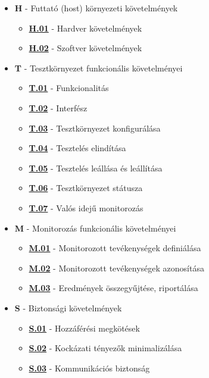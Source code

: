 \documentclass{scrreprt}
\begin{document}
\begin{itemize}
      \item \textbf{H} - Futtató (host) környezeti követelmények
            \begin{itemize}
                  \item \textbf{\hyperref[H.01]{H.01}} - Hardver követelmények
                  \item \textbf{\hyperref[H.02]{H.02}} - Szoftver követelmények
            \end{itemize}
      \item \textbf{T} - Tesztkörnyezet funkcionális követelményei
            \begin{itemize}
                  \item \textbf{\hyperref[T.01]{T.01}} - Funkcionalitás
                  \item \textbf{\hyperref[T.02]{T.02}} - Interfész
                  \item \textbf{\hyperref[T.03]{T.03}} - Tesztkörnyezet konfigurálása
                  \item \textbf{\hyperref[T.04]{T.04}} - Tesztelés elindítása
                  \item \textbf{\hyperref[T.05]{T.05}} - Tesztelés leállása és leállítása
                  \item \textbf{\hyperref[T.06]{T.06}} - Tesztkörnyezet státusza
                  \item \textbf{\hyperref[T.07]{T.07}} - Valós idejű monitorozás
            \end{itemize}
      \item \textbf{M} - Monitorozás funkcionális követelményei
            \begin{itemize}
                  \item \textbf{\hyperref[M.01]{M.01}} - Monitorozott tevékenységek definiálása
                  \item \textbf{\hyperref[M.02]{M.02}} - Monitorozott tevékenységek azonosítása
                  \item \textbf{\hyperref[M.03]{M.03}} - Eredmények összegyűjtése, riportálása
            \end{itemize}
      \item \textbf{S} - Biztonsági követelmények
            \begin{itemize}
                  \item \textbf{\hyperref[S.01]{S.01}} - Hozzáférési megkötések
                  \item \textbf{\hyperref[S.02]{S.02}} - Kockázati tényezők minimalizálása
                  \item \textbf{\hyperref[S.03]{S.03}} - Kommunikációs biztonság
            \end{itemize}
\end{itemize}
\end{document}
